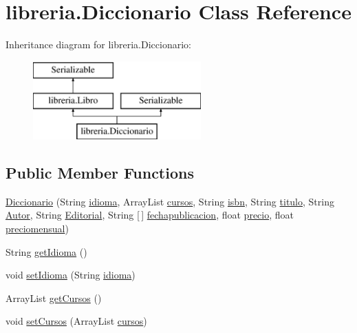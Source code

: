 \hypertarget{classlibreria_1_1_diccionario}{}\section{libreria.\+Diccionario Class Reference}
\label{classlibreria_1_1_diccionario}
Inheritance diagram for libreria.\+Diccionario\+:\begin{figure}[H]
\begin{center}
\leavevmode
\includegraphics[height=3.000000cm]{classlibreria_1_1_diccionario}
\end{center}
\end{figure}
\subsection*{Public Member Functions}
\begin{DoxyCompactItemize}
\item 
\mbox{\hyperlink{classlibreria_1_1_diccionario_adf99514425c525126dc07f482c2f834d}{Diccionario}} (String \mbox{\hyperlink{classlibreria_1_1_diccionario_ab5efd7c7392d8c91283d0c5270408d70}{idioma}}, Array\+List \mbox{\hyperlink{classlibreria_1_1_diccionario_a192b58fb0f0773bc0f857c0481a507c5}{cursos}}, String \mbox{\hyperlink{classlibreria_1_1_libro_a855939c41be35682aad6b6c08962dde3}{isbn}}, String \mbox{\hyperlink{classlibreria_1_1_libro_aa45a435366afb4759f59f6f4d86d0e3a}{titulo}}, String \mbox{\hyperlink{classlibreria_1_1_libro_aa5040773b6ae3f4b9538418a4499ba9c}{Autor}}, String \mbox{\hyperlink{classlibreria_1_1_libro_a0e45b510f79de7f6aaa678f4cf060b45}{Editorial}}, String \mbox{[}$\,$\mbox{]} \mbox{\hyperlink{classlibreria_1_1_libro_a1feec01556c7a8ffe5963b544b7ebc58}{fechapublicacion}}, float \mbox{\hyperlink{classlibreria_1_1_libro_ab19a3f31d2aaab1bca6ba4f188951adc}{precio}}, float \mbox{\hyperlink{classlibreria_1_1_libro_aa3ecf9746a1de3547b71c154ffbcbeb7}{preciomensual}})
\item 
String \mbox{\hyperlink{classlibreria_1_1_diccionario_a8acf5a51be83afc6a5880dab17a513b5}{get\+Idioma}} ()
\item 
void \mbox{\hyperlink{classlibreria_1_1_diccionario_a347e68b4c9c4afc6e20ca93f28be30a2}{set\+Idioma}} (String \mbox{\hyperlink{classlibreria_1_1_diccionario_ab5efd7c7392d8c91283d0c5270408d70}{idioma}})
\item 
Array\+List \mbox{\hyperlink{classlibreria_1_1_diccionario_a83ebd8cc75a46544f8571caebd501c6e}{get\+Cursos}} ()
\item 
void \mbox{\hyperlink{classlibreria_1_1_diccionario_a1f4a51c31338d5a50faab2fcf1b2cd1b}{set\+Cursos}} (Array\+List \mbox{\hyperlink{classlibreria_1_1_diccionario_a192b58fb0f0773bc0f857c0481a507c5}{cursos}})
\end{DoxyCompactItemize}
